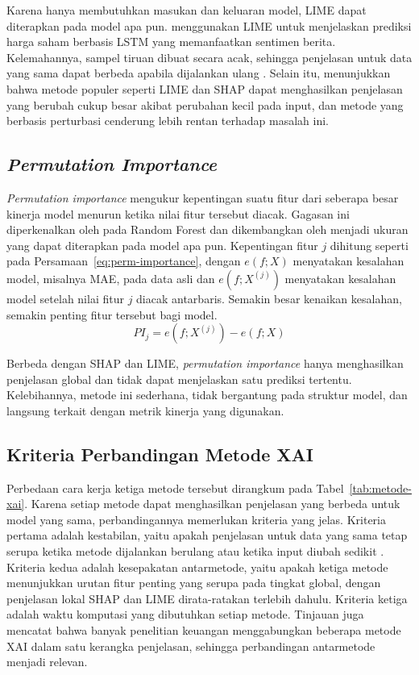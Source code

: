 Karena hanya membutuhkan masukan dan keluaran model, LIME dapat diterapkan pada model apa pun. \textcite{gite2021} menggunakan LIME untuk menjelaskan prediksi harga saham berbasis LSTM yang memanfaatkan sentimen berita. Kelemahannya, sampel tiruan dibuat secara acak, sehingga penjelasan untuk data yang sama dapat berbeda apabila dijalankan ulang \autocite{zhang2019}. Selain itu, \textcite{alvarezmelis2018} menunjukkan bahwa metode populer seperti LIME dan SHAP dapat menghasilkan penjelasan yang berubah cukup besar akibat perubahan kecil pada input, dan metode yang berbasis perturbasi cenderung lebih rentan terhadap masalah ini.

\subsection{\emph{Permutation Importance}}

\emph{Permutation importance} mengukur kepentingan suatu fitur dari seberapa besar kinerja model menurun ketika nilai fitur tersebut diacak. Gagasan ini diperkenalkan oleh \textcite{breiman2001} pada Random Forest dan dikembangkan oleh \textcite{fisher2019} menjadi ukuran yang dapat diterapkan pada model apa pun. Kepentingan fitur $j$ dihitung seperti pada Persamaan~\ref{eq:perm-importance}, dengan $e(f; X)$ menyatakan kesalahan model, misalnya MAE, pada data asli dan $e(f; X^{(j)})$ menyatakan kesalahan model setelah nilai fitur $j$ diacak antarbaris. Semakin besar kenaikan kesalahan, semakin penting fitur tersebut bagi model.
\begin{equation}
PI_j = e\left(f; X^{(j)}\right) - e\left(f; X\right)
\label{eq:perm-importance}
\end{equation}

Berbeda dengan SHAP dan LIME, \emph{permutation importance} hanya menghasilkan penjelasan global dan tidak dapat menjelaskan satu prediksi tertentu. Kelebihannya, metode ini sederhana, tidak bergantung pada struktur model, dan langsung terkait dengan metrik kinerja yang digunakan.

\subsection{Kriteria Perbandingan Metode XAI}

Perbedaan cara kerja ketiga metode tersebut dirangkum pada Tabel~\ref{tab:metode-xai}. Karena setiap metode dapat menghasilkan penjelasan yang berbeda untuk model yang sama, perbandingannya memerlukan kriteria yang jelas. Kriteria pertama adalah kestabilan, yaitu apakah penjelasan untuk data yang sama tetap serupa ketika metode dijalankan berulang \autocite{zhang2019} atau ketika input diubah sedikit \autocite{alvarezmelis2018}. Kriteria kedua adalah kesepakatan antarmetode, yaitu apakah ketiga metode menunjukkan urutan fitur penting yang serupa pada tingkat global, dengan penjelasan lokal SHAP dan LIME dirata-ratakan terlebih dahulu. Kriteria ketiga adalah waktu komputasi yang dibutuhkan setiap metode. Tinjauan \textcite{cerneviciene2024} juga mencatat bahwa banyak penelitian keuangan menggabungkan beberapa metode XAI dalam satu kerangka penjelasan, sehingga perbandingan antarmetode menjadi relevan.


